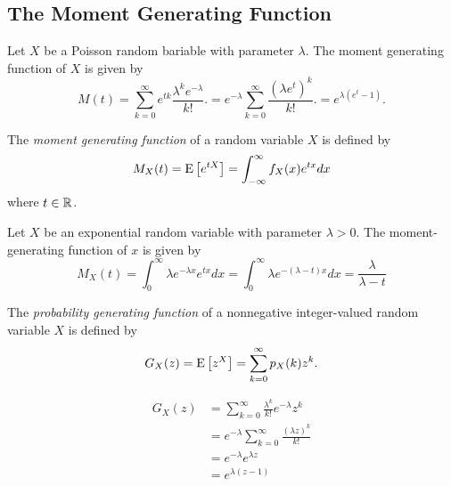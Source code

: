 \subsection{The Moment Generating Function}


\begin{example}
Let $X$ be a Poisson random bariable with parameter $\lambda$.
The moment generating function of $X$ is given by
\begin{equation*}
M(t) = \sum_{k=0}^{\infty} e^{tk} \frac{ \lambda^k e^{-\lambda}}{k!} .
= e^{-\lambda} \sum_{k=0}^{\infty} \frac{\left( \lambda e^t \right)^k}{k!} .
= e^{\lambda(e^t -1)} .
\end{equation*}

\end{example}
The \emph{moment generating function} of a random variable $X$ is defined by
\begin{equation*}
M_X (t) = \mathrm{E} \left[ e^{t X} \right]
= \int_{-\infty}^{\infty} f_X (x) e^{t x} dx
\end{equation*}
where $t \in \mathbb{R}$.



\begin{example}
Let $X$ be an exponential random variable with parameter $\lambda > 0$.
The moment-generating function of $x$ is given by
\begin{equation*}
M_X (t) = \int_0^{\infty} \lambda e^{-\lambda x} e^{tx} dx
= \int_0^{\infty} \lambda e^{-(\lambda-t) x} dx
= \frac{\lambda}{\lambda - t}
\end{equation*}
\end{example}

The \emph{probability generating function} of a nonnegative integer-valued random variable $X$ is defined by
\begin{equation*}
G_X (z) = \mathrm{E} \left[ z^X \right]
= \sum_{k=0}^{\infty} p_X(k) z^k .
\end{equation*}

\begin{equation*}
\begin{split}
G_X (z) &= \sum_{k=0}^{\infty} \frac{\lambda^k}{k!} e^{-\lambda} z^k \\
&= e^{-\lambda} \sum_{k=0}^{\infty} \frac{(\lambda z)^k}{k!} \\
&= e^{-\lambda} e^{\lambda z} \\
&= e^{\lambda (z-1)}
\end{split}
\end{equation*}




